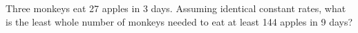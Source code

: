 Three monkeys eat 27 apples in 3 days. Assuming identical constant rates, what is the least whole number of monkeys needed to eat at least 144 apples in 9 days?
